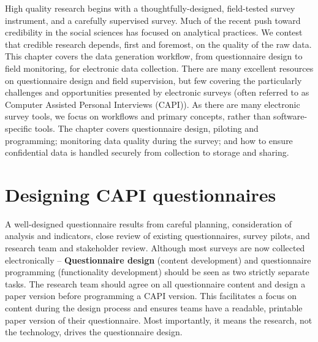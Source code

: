 
\begin{fullwidth}
High quality research begins with a thoughtfully-designed, field-tested survey instrument, and a carefully supervised survey.
Much of the recent push toward credibility in the social sciences has focused on analytical practices.
We contest that credible research depends, first and foremost, on the quality of the raw data. This chapter covers the data generation workflow, from questionnaire design to field monitoring, for electronic data collection.
There are many excellent resources on questionnaire design and field supervision,
but few covering the particularly challenges and opportunities presented by electronic surveys (often referred to as Computer Assisted Personal Interviews (CAPI)).
As there are many electronic survey tools, we focus on workflows and primary concepts, rather than software-specific tools.
The chapter covers questionnaire design, piloting and programming; monitoring data quality during the survey; and how to ensure confidential data is handled securely from collection to storage and sharing.


\end{fullwidth}


\section{Designing CAPI questionnaires}
A well-designed questionnaire results from careful planning, consideration of analysis and indicators, close review of existing questionnaires, survey pilots, and research team and stakeholder review.
Although most surveys are now collected electronically  --
\textbf{Questionnaire design}
(content development) and questionnaire programming (functionality development) should be seen as two strictly separate tasks.
The research team should agree on all questionnaire content and design a paper version before programming a CAPI version.
This facilitates a focus on content during the design process and ensures teams have a readable, printable paper version of their questionnaire.
Most importantly, it means the research, not the technology, drives the questionnaire design.

